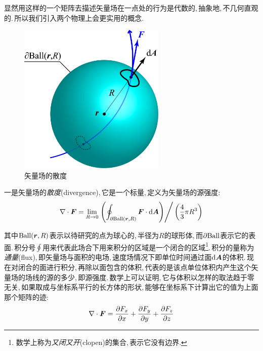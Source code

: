 显然用这样的一个矩阵去描述矢量场在一点处的行为是代数的,\,抽象地,\,不几何直观的.\,所以我们引入两个物理上会更实用的概念.

\begin{figure}
\centering
\includegraphics[width=7cm]{image/7-1-4.png}
\caption{矢量场的散度}
\end{figure}
一是矢量场的\emph{散度}(divergence),\,它是一个标量,\,定义为矢量场的源强度:
\[\nabla\cdot \boldsymbol{F}=\lim_{R\to 0}\left.\left(\oint_{\partial {\rm Ball}(\boldsymbol{r},R)}\boldsymbol{F}\cdot \textrm{d}\boldsymbol{A}\right)\right/\left(\frac{4}{3}\pi R^3\right)\]

其中\({\rm Ball}(\boldsymbol{r},R)\)表示以待研究的点为球心的,\,半径为\(R\)的球形体,\,而\(\partial {\rm Ball}\)表示它的表面.\,积分号\(\oint\)用来代表此场合下用来积分的区域是一个闭合的区域\footnote{数学上称为\emph{又闭又开}(clopen)的集合,\,表示它没有边界.}.\,积分的量称为\emph{通量}(flux),\,即矢量场与面积的电场,\,速度场情况下即单位时间通过面\(\textrm{d} \boldsymbol{A}\)的体积.\,现在对闭合的面进行积分,\,再除以面包含的体积,\,代表的是该点单位体积内产生这个矢量场的场线的源的多少,\,即源强度.\,数学上可以证明,\,它与体积以怎样的取法趋于零无关,\,如果取成与坐标系平行的长方体的形状,\,能够在坐标系下计算出它的值为上面那个矩阵的迹:
\[\nabla\cdot\boldsymbol{F}=\frac{\partial F_x}{\partial x}+\frac{\partial F_y}{\partial y}+\frac{\partial F_z}{\partial z}\]

